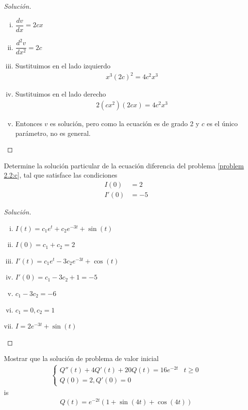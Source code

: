 \begin{proof}[Solución]
	\begin{enumerate}[(i)]
		\item $ \dfrac{dv}{dx}=2cx $
		\item $ \dfrac{d^{2}v}{dx^{2}}=2c $
		\item Sustituimos en el lado izquierdo
		\begin{align}
			x^{3}\left(2c\right)^{2}=4c^{2}x^{3}
		\end{align}
		\item Sustituimos en el lado derecho
		\begin{align}
			2\left(cx^{2}\right)\left(2cx\right)= 4c^{2}x^{3}
		\end{align}
		\item Entonces $v$ es solución, pero como la ecuación es de grado 2 y $c$ es el único parámetro, no es general.
	\end{enumerate}
\end{proof}



\begin{resuelto}
	Determine la solución particular de la ecuación diferencia del problema \ref{problem 2.2:c}, tal que satisface las condiciones
	\begin{align}
		I(0)&=2\\
		I'(0)&=-5
	\end{align}
\end{resuelto}




\begin{proof}[Solución]
	\begin{enumerate}[(i)]
		\item $I(t)=c_{1}e^{t}+c_{2}e^{-3t}+\sin(t)$
		\item $I(0)= c_{1}+c_{2}=  2$
		\item $I'(t)= c_{1}e^{t}-3c_{2}e^{-3t}+\cos(t)$
		\item $I'(0)= c_{1}-3c_{2}+1= -5$
		\item $c_{1}-3c_{2}=-6$
		\item $c_{1}=0, c_{2}=1$
		\item $I= 2e^{-3t}+\sin(t)$
	\end{enumerate}
\end{proof}



\begin{resuelto}
	Mostrar que la solución de problema de valor inicial
	\begin{align}
		\begin{cases}
			Q''(t)+4Q'(t)+20Q(t)=16e^{-2t} & t\geq 0 \\
			Q(0) = 2, Q'(0)=0 &
		\end{cases}
	\end{align}
	is
	\begin{align}
		Q(t) = e^{-2t}\left(
		1+\sin(4t)+\cos(4t)
		\right)
	\end{align}
\end{resuelto}



